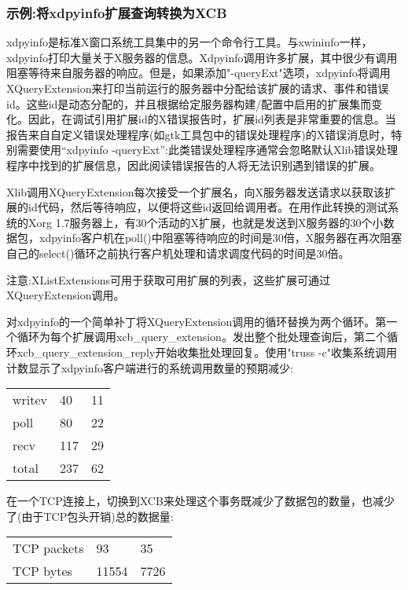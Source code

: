 \subsubsection{示例:将xdpyinfo扩展查询转换为XCB}

xdpyinfo是标准X窗口系统工具集中的另一个命令行工具。与xwininfo一样，xdpyinfo打印大量关于X服务器的信息。Xdpyinfo调用许多扩展，其中很少有调用阻塞等待来自服务器的响应。但是，如果添加"-queryExt"选项，xdpyinfo将调用XQueryExtension来打印当前运行的服务器中分配给该扩展的请求、事件和错误id。这些id是动态分配的，并且根据给定服务器构建/配置中启用的扩展集而变化。因此，在调试引用扩展id的X错误报告时，扩展id列表是非常重要的信息。当报告来自自定义错误处理程序(如gtk工具包中的错误处理程序)的X错误消息时，特别需要使用“xdpyinfo -queryExt”:此类错误处理程序通常会忽略默认Xlib错误处理程序中找到的扩展信息，因此阅读错误报告的人将无法识别遇到错误的扩展。

Xlib调用XQueryExtension每次接受一个扩展名，向X服务器发送请求以获取该扩展的id代码，然后等待响应，以便将这些id返回给调用者。在用作此转换的测试系统的Xorg 1.7服务器上，有30个活动的X扩展，也就是发送到X服务器的30个小数据包，xdpyinfo客户机在poll()中阻塞等待响应的时间是30倍，X服务器在再次阻塞自己的select()循环之前执行客户机处理和请求调度代码的时间是30倍。

\begin{note}
注意:XListExtensions可用于获取可用扩展的列表，这些扩展可通过XQueryExtension调用。
\end{note}

对xdpyinfo的一个简单补丁将XQueryExtension调用的循环替换为两个循环。第一个循环为每个扩展调用xcb\_query\_extension。发出整个批处理查询后，第二个循环xcb\_query\_extension\_reply开始收集批处理回复。使用"truss -c"收集系统调用计数显示了xdpyinfo客户端进行的系统调用数量的预期减少:

\begin{center}
	\begin{supertabular}{|l|l|l|}
		writev & 40 & 11\\
		poll & 80 & 22\\
		recv & 117 & 29\\
		total & 237 & 62\\
		\hline
	\end{supertabular}
\end{center}

\noindent 在一个TCP连接上，切换到XCB来处理这个事务既减少了数据包的数量，也减少了(由于TCP包头开销)总的数据量:
\begin{center}
	\begin{supertabular}{|l|l|l|}
		TCP packets & 93 & 35\\
		TCP bytes & 11554 & 7726\\
		\hline
	\end{supertabular}
\end{center}

